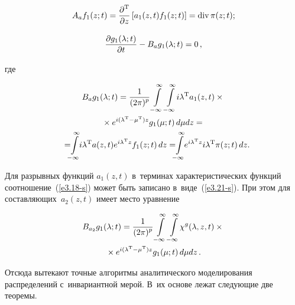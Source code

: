 \begin{multicols}{2}
     \noindent
     \begin{equation*}
      A_a f_1(z;t)=\displaystyle\frac{\displaystyle \partial^{\mathrm{T}}\mathstrut}{\displaystyle \partial z\mathstrut} \left[ a_1(z,t) f_1(z;t)\right] = \mathrm{div}\, \pi(z;t);
      \end{equation*}
      
     
      
      \noindent
           \begin{equation}
\displaystyle\frac{\displaystyle \partial g_1 (\lambda;t)\mathstrut}{\displaystyle \partial t\mathstrut} - B_a g_1(\lambda;t) =0\,,
\label{e3.21-s}
\end{equation}



\noindent
где

\vspace*{-9pt}

\noindent
\begin{multline*}
B_a g_1(\la;t) =\fr{1}{(2\pi)^p} \iin\iin \! i\la^{\mathrm{T}} a_1(z,t)\times{}\\
{}\times  e^{i(\la^{\mathrm{T}}-\mu^{\mathrm{T}})z} g_1(\mu;t)\, d\mu dz={}\\
{}=\!\!\! \iin \!\! i\la^{\mathrm{T}} a(z,t) e^{i\la^{\mathrm{T}}z} f_1(z;t)\, dz= 
\!\! \!\iin\!\! e^{i\la^{\mathrm{T}} z} i\la^{\mathrm{T}} \pi(z;t)\, dz.\hspace*{-6.03pt}
\end{multline*}

\vspace*{-2pt}

Для разрывных функций $a_1 (z,t)$ в~терминах характеристических функций соотношение~(\ref{e3.18-s}) может быть записано в~виде~(\ref{e3.21-s}). При этом для
со\-став\-ля\-ющих~$a_2(z,t)$  имеет место уравнение

\vspace*{-6pt}

\noindent
  \begin{multline}
  B_{a_2} g_1(\lambda;t) = \displaystyle\frac{\displaystyle 1\mathstrut}{\displaystyle (2\pi)^p\mathstrut} \int\limits_{-\infty}^\infty\int\limits_{-\infty}^\infty \!\chi^g(\lambda,z,t) \times{}\\
  {}\times e^{i(\lambda^{\mathrm{T}}-\mu^{\mathrm{T}})z} g_1(\mu;t)\, d\mu dz\,.
  \label{e3.22-s}
  \end{multline}
  
  \vspace*{2pt}
  
  \noindent
Отсюда вытекают точные алгоритмы аналитического
моделирования распределений с~инвариантной мерой. В~их основе лежат
следующие две теоремы.

\vspace*{1pt}


\end{multicols}
